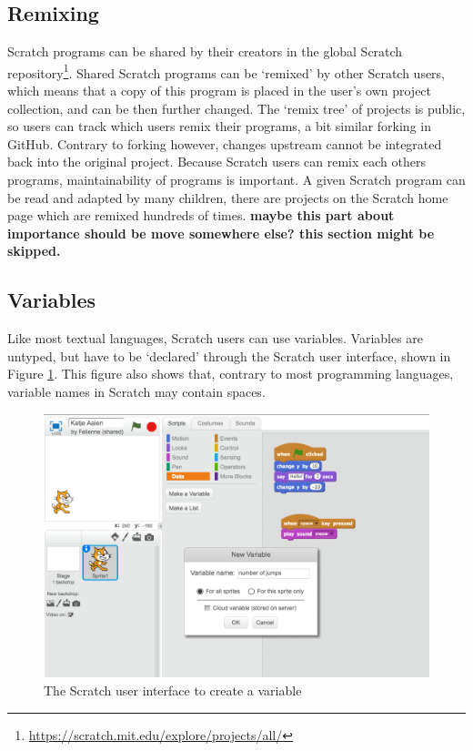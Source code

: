 \documentclass[conference]{IEEEtran}
\newcommand{\todo}[1]{ \textbf{#1} }
\begin{document}
\subsection{Remixing}
Scratch programs can be shared by their creators in the global Scratch repository\footnote{\url{https://scratch.mit.edu/explore/projects/all/}}. Shared Scratch programs can be `remixed' by other Scratch users, which means that a copy of this program is placed in the user's own project collection, and can be then further changed. The `remix tree' of projects is public, so users can track which users remix their programs, a bit similar forking in GitHub. Contrary to forking however, changes upstream cannot be integrated back into the original project. Because Scratch users can remix each others programs, maintainability of programs is important. A given Scratch program can be read and adapted by many children, there are projects on the Scratch home page which are remixed hundreds of times. \todo{maybe this part about importance should be move somewhere else? this section might be skipped.}

\subsection{Variables}
Like most textual languages, Scratch users can use variables. Variables are untyped, but have to be `declared' through the Scratch user interface, shown in Figure \ref{fig:ui-vars}. This figure also shows that, contrary to most programming languages, variable names in Scratch may contain spaces.

\begin{figure}
  \begin{center}
  \includegraphics[width=\columnwidth]{fig/ui-vars.png}
  \caption{The Scratch user interface to create a variable}
  \label{fig:ui-vars}
  \end{center}
\end{figure} 
\end{document}
